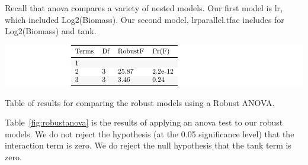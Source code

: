 \vspace{12pt}


 Recall that anova compares a variety of nested models. Our first model is lr, which included Log2(Biomass). Our second model, lrparallel.tfac includes for Log2(Biomass) and tank. 
 



\begin{table}[H]
\includegraphics{Chapter3Images/robustanova.pdf}
\caption{Table of results for comparing the robust models using a Robust ANOVA.}
\label{fig:robustanova}
\end{table}

Table~\ref{fig:robustanova} is the results of applying an anova test to our robust models. We do not reject the hypothesis (at the 0.05 significance level) that the interaction term is zero. We do reject the null hypothesis that the tank term is zero.















